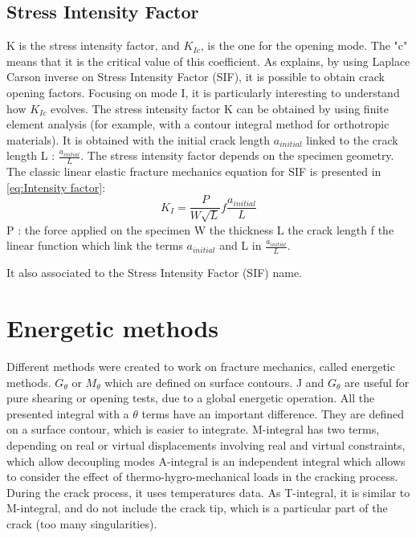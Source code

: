 \subsection{Stress Intensity Factor}
K is  the stress intensity factor, and $K_{Ic}$, is the one for the opening mode. The "c" means that it is the critical value of this coefficient. As \parencite{Reference10} explains, by using Laplace Carson inverse on Stress Intensity Factor (SIF), it is possible to obtain crack opening factors. Focusing on mode I, it is particularly interesting to understand how $K_{Ic}$ evolves. The stress intensity factor K can be obtained by using finite element analysis (for example, with a contour integral method for orthotropic materials). It is obtained with the initial crack length $a_{initial}$ linked to the crack length L : $\frac{a_{initial}}{L}$.
The stress intensity factor depends on the specimen geometry. The classic linear elastic fracture mechanics equation for SIF is presented in \ref{eq:Intensity factor}:
\begin{equation}
	K_{I}=\frac{P}{W\sqrt{L}}f\frac{a_{initial}}{L} 	
	\label{eq:Intensity factor}
\end{equation} 						
P : the force applied on the specimen 
W the thickness
L the crack length 
f the linear function which link the terms $a_{initial}$ and L in $\frac{a_{initial}}{L}$. 

It also associated to the Stress Intensity Factor (SIF) name. 


\section{Energetic methods}

Different methods were created to work on fracture mechanics, called energetic methods. $G_{\theta}$ or $M_{\theta}$ which are defined on surface contours. J and $G_{\theta}$ are useful for pure shearing or opening tests, due to a global energetic operation. All the presented integral with a $\theta$ terms have an important difference. They are defined on a surface contour, which is easier to integrate. M-integral has two terms, depending on real or virtual displacements involving real and virtual constraints, which allow decoupling modes
A-integral is an independent integral which allows to consider the effect of thermo-hygro-mechanical loads in the cracking process. During the crack process, it uses temperatures data. As T-integral, it is similar to M-integral, and do not include the crack tip, which is a particular part of the crack (too many singularities).

